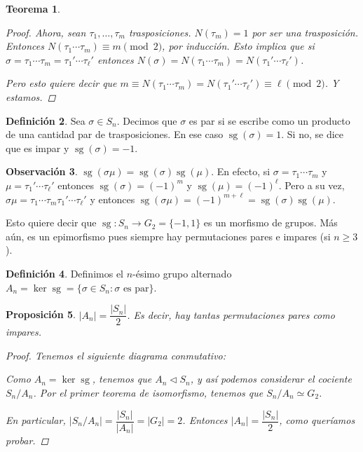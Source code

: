 \documentclass[12pt]{book}
\newtheorem{teo}{Teorema}[section]
\newtheorem{prop}[teo]{Proposición}
\theoremstyle{definition}
\newtheorem{obs}[teo]{Observación}
\newtheorem{defn}[teo]{Definición}
\DeclareMathOperator{\sg}{sg}
\begin{document}
\begin{teo}
\begin{proof}
Ahora, sean $\tau_1,\ldots ,\tau_m$ trasposiciones. $N(\tau_m)=1$ por ser una trasposición. Entonces $N(\tau_1\cdots \tau_m) \equiv m \pmod{2}$, por inducción. Esto implica que si $\sigma = \tau_1\cdots\tau_m = \tau_1'\cdots\tau_\ell'$ entonces $N(\sigma)=N(\tau_1\cdots \tau_m)=N(\tau_1'\cdots \tau_\ell')$. 

Pero esto quiere decir que $m \equiv N(\tau_1\cdots \tau_m)=N(\tau_1'\cdots \tau_\ell') \equiv \ell \pmod{2}$. Y estamos.
\end{proof}
\end{teo}

\begin{defn}
Sea $\sigma\in S_n$. Decimos que $\sigma$ es par si se escribe como un producto de una cantidad par de trasposiciones. En ese caso $\sg(\sigma)=1$. Si no, se dice que es impar y $\sg(\sigma)=-1$.
\end{defn}

\begin{obs}
$\sg(\sigma\mu)=\sg(\sigma)\sg(\mu)$. En efecto, si $\sigma=\tau_1\cdots\tau_m$ y $\mu=\tau_1'\cdots \tau_\ell'$ entonces $\sg(\sigma)=(-1)^m$ y $\sg(\mu) = (-1)^\ell$. Pero a su vez, $\sigma\mu = \tau_1\cdots \tau_m \tau_1'\cdots \tau_\ell'$ y entonces $\sg(\sigma\mu)=(-1)^{m+\ell} = \sg(\sigma)\sg(\mu)$.

Esto quiere decir que $\sg:S_n\to G_2 = \{-1,1\}$ es un morfismo de grupos. Más aún, es un epimorfismo pues siempre hay permutaciones pares e impares (si $n\geq 3$).
\end{obs}

\begin{defn}
Definimos el $n$-ésimo grupo alternado $A_n = \ker \sg = \{\sigma\in S_n : \sigma \text{ es par}\}$.
\end{defn}

\begin{prop}
$|A_n| = \dfrac{|S_n|}{2}$. Es decir, hay tantas permutaciones pares como impares.
\begin{proof}
Tenemos el siguiente diagrama conmutativo:
\begin{center}
\end{center}
Como $A_n = \ker\sg$, tenemos que $A_n\triangleleft S_n$, y así podemos considerar el cociente $S_n/A_n$. Por el primer teorema de isomorfismo, tenemos que $S_n/A_n \simeq G_2$. 

En particular, $|S_n/A_n|= \dfrac{|S_n|}{|A_n|} = |G_2|=2$. Entonces $|A_n|=\dfrac{|S_n|}{2}$, como queríamos probar.

\end{proof}
\end{prop}
\end{document}
